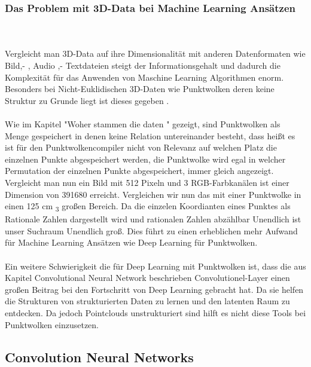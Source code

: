 \documentclass{llncs}
\begin{document}
\subsubsection{Das Problem mit 3D-Data bei Machine Learning Ansätzen}\label{sec:3dprobleme}
~\\\\
Vergleicht man 3D-Data auf ihre Dimensionalität mit anderen Datenformaten wie Bild,- , Audio ,- Textdateien steigt der Informationsgehalt und dadurch die Komplexität für das Anwenden von Maschine Learning Algorithmen enorm. Besonders bei Nicht-Euklidischen 3D-Daten wie Punktwolken deren keine Struktur zu Grunde liegt ist dieses gegeben \cite{3dprob}.
\\\\
Wie im Kapitel "Woher stammen die daten " gezeigt, sind Punktwolken als Menge gespeichert in denen keine Relation untereinander besteht, dass heißt es ist für den Punktwolkencompiler nicht von Relevanz auf welchen Platz die einzelnen Punkte abgespeichert werden, die Punktwolke wird egal in welcher Permutation der einzelnen Punkte abgespeichert, immer gleich angezeigt. Vergleicht man nun ein Bild mit 512 Pixeln und 3 RGB-Farbkanälen ist einer Dimension von 391680 erreicht. Vergleichen wir nun das mit einer Punktwolke in einen 125 cm \textsubscript{3} großen Bereich. Da die einzelen Koordianten eines Punktes als Rationale Zahlen dargestellt wird und rationalen Zahlen abzählbar Unendlich ist unser Suchraum Unendlich groß. Dies führt zu einen erheblichen mehr Aufwand für Machine Learning Ansätzen wie Deep Learning für Punktwolken.
\\\\
Ein weitere Schwierigkeit die für Deep Learning mit Punktwolken ist, dass die aus Kapitel Convolutional Neural Network beschrieben Convolutionel-Layer einen großen Beitrag bei den Fortschritt von Deep Learning gebracht hat. Da sie helfen die Strukturen von strukturierten Daten zu lernen und den latenten Raum zu entdecken. Da jedoch Pointclouds unstrukturiert sind hilft es nicht diese Tools bei Punktwolken einzusetzen\cite{3dgan}.  

\subsection{Convolution Neural Networks}
\end{document}
